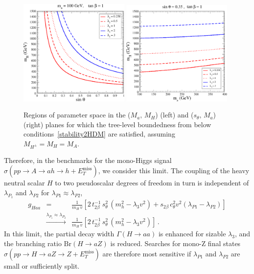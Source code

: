     \begin{figure}[h!]
\begin{center}
\includegraphics[width=0.485\textwidth]{texinputs/03_theoparameters/Figs/Plot_Eq.pdf}
\includegraphics[width=0.485\textwidth]{texinputs/03_theoparameters/Figs/Plot_ma.pdf}
\caption{\small Regions of parameter space in the 
    ($M_a,\, M_{H}$) (left) and ($s_{\theta},\, M_a$) (right) planes for which the tree-level boundedness from below conditions~\eqref{stability2HDM} are satisfied, assuming $M_{H^{\pm}} = M_{H} = M_{A}$. \label{Fig_Stability}}
\end{center}
\vspace{-2mm}
\end{figure}
%
%
Therefore, in the benchmarks for the mono-Higgs signal $\sigma (pp \to A \to ah \to h + E_T^\text{miss})$, we consider this limit. The coupling of the heavy neutral scalar $H$ to two pseudoscalar degrees of freedom in turn is independent of $\lambda_{P_1}$ and $\lambda_{P2}$ for $\lambda_{P1}\approx \lambda_{P2}$,
    \begin{eqnarray}
     g_{Haa} &=& \frac{1}{m_{H} \,v} \left[ 2\, t_{2\beta}^{-1}\, s_{\theta}^2\, 
(m_h^2 - \lambda_3 v^2) + s_{2\beta}\, c_{\theta}^2 v^2 (\lambda_{P1} - \lambda_{P2}) \right] \nonumber \\
&\stackrel{\lambda_{P_1}\approx \lambda_{P_2}}{\longrightarrow} & \frac{1}{m_{H} \,v} \left[ 2\, t_{2\beta}^{-1}\, s_{\theta}^2\, 
(m_h^2 - \lambda_3 v^2) \right] \,. 
    \end{eqnarray}
In this limit, the partial decay width $\Gamma(H \to aa)$ is enhanced for sizable $\lambda_3$, and the branching ratio $\text{Br}(H \to aZ)$ is reduced. Searches for mono-Z final states $\sigma(pp \to H \to aZ \to Z + E_T^\text{miss})$ are therefore most sensitive if $\lambda_{P1}$ and $\lambda_{P2}$ are small or sufficiently split.

 


